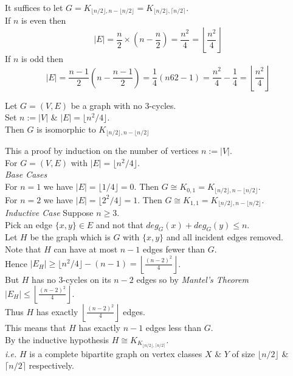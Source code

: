 \documentclass[11pt,a4paper]{article}
\begin{document}
It suffices to let $G=K_{\lfloor n/2\rfloor,n-\lfloor n/2\rfloor}=K_{\lfloor n/2\rfloor,\lceil n/2\rceil}$.\\
If $n$ is even then
$$|E|=\frac{n}{2}\times\left(n-\frac{n}{2}\right)=\frac{n^2}{4}=\left\lfloor\frac{n^2}{4}\right\rfloor$$
If $n$ is odd then
$$|E|=\frac{n-1}{2}\left(n-\frac{n-1}{2}\right)=\frac{1}{4}(n62-1)=\frac{n^2}{4}-\frac{1}{4}=\left\lfloor\frac{n^2}{4}\right\rfloor$$

\theorem{}
Let $G=(V,E)$ be a graph with no $3$-cycles.\\
Set $n:=|V|$ \& $|E|=\lfloor n^2/4\rfloor$.\\
Then $G$ is isomorphic to $K_{\lfloor n/2\rfloor,n-\lfloor n/2\rfloor}$

This a proof by induction on the number of vertices $n:=|V|$.\\
For $G=(V,E)$ with $|E|=\lfloor n^2/4\rfloor$.\\
\textit{Base Cases}\\
For $n=1$ we have $|E|=\lfloor1/4\rfloor=0$. Then $G\cong K_{0,1}=K_{\lfloor n/2\rfloor,n-\lfloor n/2\rfloor}$.\\
For $n=2$ we have $|E|=\lfloor2^2/4\rfloor=1$. Then $G\cong K_{1,1}=K_{\lfloor n/2\rfloor,n-\lfloor n/2\rfloor}$.\\
\textit{Inductive Case}
Suppose $n\geq3$.\\
Pick an edge $\{x,y\}\in E$ and not that $deg_G(x)+deg_G(y)\leq n$.\\
Let $H$ be the graph which is $G$ with $\{x,y\}$ and all incident edges removed.\\
Note that $H$ can have at most $n-1$ edges fewer than $G$.\\
Hence $|E_H|\geq\lfloor n^2/4\rfloor-(n-1)=\left\lfloor\frac{(n-2)^2}{4}\right\rfloor$.\\
But $H$ has no $3$-cycles on its $n-2$ edges so by \textit{Mantel's Theorem} $|E_H|\leq\left\lfloor\frac{(n-2)^2}{4}\right\rfloor$.\\
Thus $H$ has exactly $\left\lfloor\frac{(n-2)^2}{4}\right\rfloor$ edges.\\
This means that $H$ has exactly $n-1$ edges less than $G$.\\
By the inductive hypothesis $H\cong K_{K_{\lfloor n/2\rfloor,\lceil n/2\rceil}}$.\\
\textit{i.e.} $H$ is a complete bipartite graph on vertex classes $X$ \& $Y$ of size $\lfloor n/2\rfloor$ \& $\lceil n/2\rceil$ respectively.\\
\end{document}
